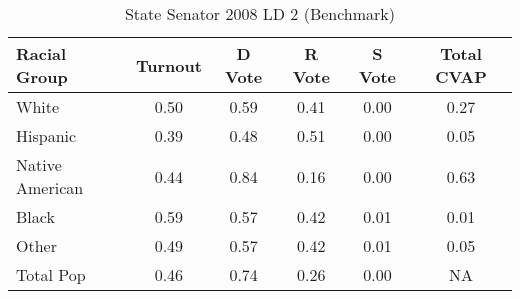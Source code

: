 \begin{table}[htb]
\begin{center}
\caption{State Senator 2008 LD 2 (Benchmark)}
\label{stsen08_cvap_ld_2_benchmark}
\begin{tabular}{lccccc}
  \hline
Racial Group & Turnout & D Vote & R Vote & S Vote & Total CVAP \\ 
  \hline
	
    White & 0.50  & 0.59  & 0.41  & 0.00 & 0.27 \\
    Hispanic & 0.39  & 0.48  & 0.51  & 0.00 & 0.05 \\
    Native American & 0.44  & 0.84  & 0.16  & 0.00 & 0.63\\
    Black & 0.59  & 0.57  & 0.42  & 0.01 & 0.01 \\
    Other & 0.49  & 0.57  & 0.42  & 0.01 & 0.05\\

    Total Pop & 0.46  & 0.74  & 0.26  & 0.00  & NA \\
   \hline
\end{tabular}
\end{center}
\end{table}